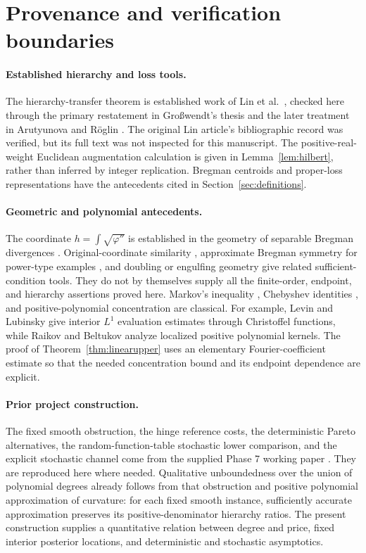 \documentclass[11pt]{article}
\theoremstyle{definition}\newtheorem{definition}[theorem]{Definition}
\theoremstyle{remark}\newtheorem{remark}[theorem]{Remark}
\newcommand{\ph}{\varphi}
\begin{document}
\section{Provenance and verification boundaries}
\label{sec:provenance}
\paragraph{Established hierarchy and loss tools.}
The hierarchy-transfer theorem is established work of Lin et al.\ \cite{lin}, checked here through the primary restatement in Gro\ss wendt's thesis \cite[Theorem 2.11]{grosswendt} and the later treatment in Arutyunova and R\"oglin \cite{arutyunova}. The original Lin article's bibliographic record was verified, but its full text was not inspected for this manuscript. The positive-real-weight Euclidean augmentation calculation is given in Lemma~\ref{lem:hilbert}, rather than inferred by integer replication. Bregman centroids and proper-loss representations have the antecedents cited in Section~\ref{sec:definitions}.

\paragraph{Geometric and polynomial antecedents.}
The coordinate $h=\int\sqrt{\ph''}$ is established in the geometry of separable Bregman divergences \cite{gomes,gzyl}. Original-coordinate similarity \cite{ackermann}, approximate Bregman symmetry for power-type examples \cite{kindermann}, and doubling or engulfing geometry \cite{calogero,maldonado} give related sufficient-condition tools. They do not by themselves supply all the finite-order, endpoint, and hierarchy assertions proved here. Markov's inequality \cite{shadrin}, Chebyshev identities \cite{dlmf}, and positive-polynomial concentration are classical. For example, Levin and Lubinsky \cite[Theorem 1.3]{levin} give interior $L^1$ evaluation estimates through Christoffel functions, while Raikov and Beltukov \cite{raikov} analyze localized positive polynomial kernels. The proof of Theorem~\ref{thm:linearupper} uses an elementary Fourier-coefficient estimate so that the needed concentration bound and its endpoint dependence are explicit.

\paragraph{Prior project construction.}
The fixed smooth obstruction, the hinge reference costs, the deterministic Pareto alternatives, the random-function-table stochastic lower comparison, and the explicit stochastic channel come from the supplied Phase 7 working paper \cite[Section 4]{huang7}. They are reproduced here where needed. Qualitative unboundedness over the union of polynomial degrees already follows from that obstruction and positive polynomial approximation of curvature: for each fixed smooth instance, sufficiently accurate approximation preserves its positive-denominator hierarchy ratios. The present construction supplies a quantitative relation between degree and price, fixed interior posterior locations, and deterministic and stochastic asymptotics.
\end{document}
